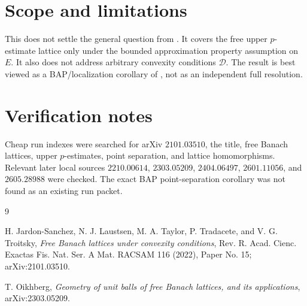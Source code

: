 \documentclass[11pt]{amsart}
\begin{document}
\section*{Scope and limitations}

This does not settle the general question from \cite{JLTTT2022}.  It covers
the free upper \(p\)-estimate lattice only under the bounded approximation
property assumption on \(E\).  It also does not address arbitrary convexity
conditions \(\mathcal D\).  The result is best viewed as a BAP/localization
corollary of \cite{Oikhberg2023}, not as an independent full resolution.

\section*{Verification notes}

Cheap run indexes were searched for arXiv \(2101.03510\), the title, free
Banach lattices, upper \(p\)-estimates, point separation, and lattice
homomorphisms.  Relevant later local sources \(2210.00614\), \(2303.05209\),
\(2404.06497\), \(2601.11056\), and \(2605.28988\) were checked.  The exact
BAP point-separation corollary was not found as an existing run packet.

\begin{thebibliography}{9}

H. Jardon-Sanchez, N. J. Laustsen, M. A. Taylor, P. Tradacete, and
V. G. Troitsky,
\emph{Free Banach lattices under convexity conditions},
Rev. R. Acad. Cienc. Exactas Fis. Nat. Ser. A Mat. RACSAM 116 (2022),
Paper No. 15; arXiv:2101.03510.

T. Oikhberg,
\emph{Geometry of unit balls of free Banach lattices, and its applications},
arXiv:2303.05209.

\end{thebibliography}
\end{document}
